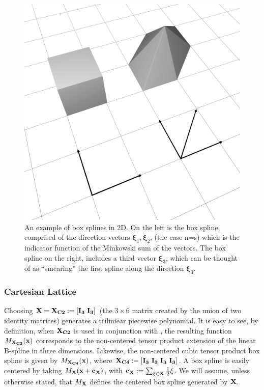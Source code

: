 \begin{figure}
  \centering
  \mbox{} \hfill
	\includegraphics[width=\linewidth]{figures/boxspline/2dex}
  \caption{\label{fig:box2d}%
  An example of box splines in 2D. On the left is the box spline comprised of the direction vectors $\mathbf{\xi}_1, \mathbf{\xi}_2$, (the case n=s) which is the indicator function of the Minkowski sum of the vectors. The box spline on the right, includes a third vector $\mathbf{\xi}_3$, which can be thought of as ``smearing'' the first spline along the direction $\mathbf{\xi}_3$.
  }
\end{figure}


\subsubsection{Cartesian Lattice}
Choosing $\mathbf{\mathbf{X} = \mathbf{X}_{C2} := \left[ I_3  \ I_3 \right]}$ (the $3 \times 6$ matrix created by the union of two identity matrices) generates a triliniear piecewise polynomial. It is easy to see, by definition, when $\mathbf{\mathbf{X}_{C2}}$ is used in conjunction with , the resulting function $M_\mathbf{\mathbf{X}_{C2}}(\mathbf{x})$ corresponds to the non-centered tensor product extension of the linear B-spline in three dimensions. Likewise, the non-centered cubic tensor product box spline is given by $M_\mathbf{\mathbf{X}_{C4}}(\mathbf{x})$, where $\mathbf{\mathbf{X}_{C4} := \left[ I_3  \ I_3 \ I_3  \ I_3 \right]}$. A box spline is easily centered by taking $M_\mathbf{\mathbf{X}}(\mathbf{x} + \mathbf{c_{\mathbf{X}}})$, with $\mathbf{c_{\mathbf{X}}}:=\sum_{\xi \in \mathbf{\mathbf{X}}} \frac{1}{2}\xi$. We will assume, unless otherwise stated, that $M_\mathbf{\mathbf{X}}$ defines the centered box spline generated by $\mathbf{\mathbf{X}}$.

